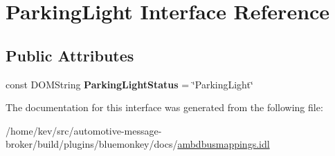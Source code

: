 \hypertarget{interfaceParkingLight}{\section{Parking\+Light Interface Reference}
\label{interfaceParkingLight}
}
\subsection*{Public Attributes}
\begin{DoxyCompactItemize}
\item 
\hypertarget{interfaceParkingLight_a2f2441de52369f858974a311cfab4c30}{const D\+O\+M\+String {\bfseries Parking\+Light\+Status} = \char`\"{}Parking\+Light\char`\"{}}\label{interfaceParkingLight_a2f2441de52369f858974a311cfab4c30}

\end{DoxyCompactItemize}


The documentation for this interface was generated from the following file\+:\begin{DoxyCompactItemize}
\item 
/home/kev/src/automotive-\/message-\/broker/build/plugins/bluemonkey/docs/\hyperlink{ambdbusmappings_8idl}{ambdbusmappings.\+idl}\end{DoxyCompactItemize}
